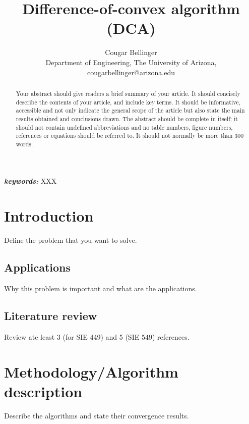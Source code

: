 \documentclass[letterpaper,11 pt]{article}
\newtheorem{algorithm}{Algorithm}
\providecommand{\keywords}[1]{\textbf{\textit{keywords:}} #1}
\begin{document}
\allowdisplaybreaks
\title{Difference-of-convex algorithm (DCA)}


\author{Cougar Bellinger\\{\small Department of Engineering,} {\small The University of Arizona,} \\ {\small cougarbellinger@arizona.edu}}

\date{}


\maketitle
\begin{abstract}
Your abstract should give readers a brief summary of your article. It should concisely describe the contents of your article, and include key terms. It should be informative, accessible and not only indicate the general scope of the article but also state the main results obtained and conclusions drawn. The abstract should be complete in itself; it should not contain undefined abbreviations and no table numbers, figure numbers, references or equations should be referred to. It should not normally be more than 300 words.

\end{abstract}
\keywords{XXX}
\section{Introduction}
\label{intro}
Define the problem that you want to solve. 

\subsection{Applications} 
Why this problem is important and what are the applications. 

\subsection{ Literature review}
Review ate least 3 (for SIE 449) and 5 (SIE 549) references. 



\section{Methodology/Algorithm description}\label{sec:method}
Describe the algorithms and state their convergence results.
 

\end{document}
